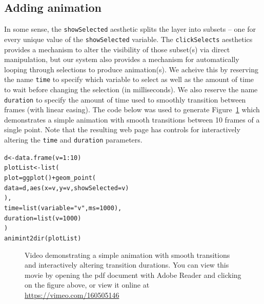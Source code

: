 \documentclass[12pt]{article}\usepackage[]{graphicx}\usepackage[]{color}
\makeatletter
\newcommand{\hlnum}[1]{\textcolor[rgb]{0,0,0}{#1}}%
\newcommand{\hlstr}[1]{\textcolor[rgb]{0.502,0,0}{#1}}%
\newcommand{\hlopt}[1]{\textcolor[rgb]{0,0,0}{#1}}%
\newcommand{\hlstd}[1]{\textcolor[rgb]{0,0,0}{#1}}%
\newcommand{\hlkwb}[1]{\textcolor[rgb]{0,0,0}{#1}}%
\newcommand{\hlkwc}[1]{\textcolor[rgb]{0,0,1}{#1}}%
\newcommand{\hlkwd}[1]{\textcolor[rgb]{0,0,0}{#1}}%
\newenvironment{kframe}{%
 \def\at@end@of@kframe{}%
 \ifinner\ifhmode%
  \def\at@end@of@kframe{\end{minipage}}%
  \begin{minipage}{\columnwidth}%
 \fi\fi%
 \def\FrameCommand##1{\hskip\@totalleftmargin \hskip-\fboxsep
 \colorbox{shadecolor}{##1}\hskip-\fboxsep
     \hskip-\linewidth \hskip-\@totalleftmargin \hskip\columnwidth}%
 \MakeFramed {\advance\hsize-\width
   \@totalleftmargin\z@ \linewidth\hsize
   \@setminipage}}%
 {\par\unskip\endMakeFramed%
 \at@end@of@kframe}
\newenvironment{knitrout}{}{} %
\makeatother
\begin{document}
\subsection{Adding animation}
\label{sec:animation}

In some sense, the \texttt{showSelected} aesthetic splits the layer into subsets
-- one for every unique value of the \texttt{showSelected} variable. The 
\texttt{clickSelects} aesthetics provides a mechanism to alter the visibility 
of those subset(s) via direct manipulation, but our system also provides a 
mechanism for automatically looping through selections to produce animation(s).
We acheive this by reserving the name \texttt{time} to specify which variable 
to select as well as the amount of time to wait before changing the selection 
(in milliseconds). We also reserve the name \texttt{duration} to specify the 
amount of time used to smoothly transition between frames (with linear easing). 
The code below was used to generate Figure~\ref{fig:animation} which 
demonstrates a simple animation with smooth transitions between 10 frames of a
single point. Note that the resulting web page has controls for interactively
altering the \texttt{time} and \texttt{duration} parameters. 

\begin{knitrout}
\color{fgcolor}\begin{kframe}
\begin{alltt}
\hlstd{d} \hlkwb{<-} \hlkwd{data.frame}\hlstd{(}\hlkwc{v} \hlstd{=} \hlnum{1}\hlopt{:}\hlnum{10}\hlstd{)}
\hlstd{plotList} \hlkwb{<-} \hlkwd{list}\hlstd{(}
  \hlkwc{plot} \hlstd{=} \hlkwd{ggplot}\hlstd{()} \hlopt{+} \hlkwd{geom_point}\hlstd{(}
    \hlkwc{data} \hlstd{= d,} \hlkwd{aes}\hlstd{(}\hlkwc{x}\hlstd{=v,} \hlkwc{y}\hlstd{=v,} \hlkwc{showSelected}\hlstd{=v)}
  \hlstd{),}
  \hlkwc{time} \hlstd{=} \hlkwd{list}\hlstd{(}\hlkwc{variable} \hlstd{=} \hlstr{"v"}\hlstd{,} \hlkwc{ms} \hlstd{=} \hlnum{1000}\hlstd{),}
  \hlkwc{duration} \hlstd{=} \hlkwd{list}\hlstd{(}\hlkwc{v} \hlstd{=} \hlnum{1000}\hlstd{)}
\hlstd{)}
\hlkwd{animint2dir}\hlstd{(plotList)}
\end{alltt}
\end{kframe}
\end{knitrout}


\begin{figure}[htp]
	\centerline{}
	\label{fig:animation}
	\caption{Video demonstrating a simple animation with smooth transitions and interactively altering transition durations. You can view this movie by opening the pdf document with Adobe Reader and clicking on the figure above, or view it online at \url{https://vimeo.com/160505146}}
\end{figure}
\end{document}
